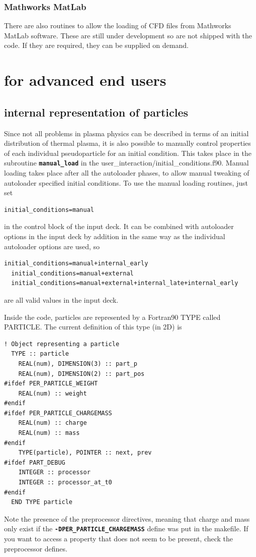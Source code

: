 \documentclass[12pt,a4paper]{article}
\newcommand{\simpleboxverbatim}{\begin{Verbatim}[obeytabs=true,frame=single,
  framerule=0.5mm,rulecolor=\color{warwickmid},formatcom=\color{black}]}
\newcommand{\inlinecode}[1]{{\color{warwickred} \bf\texttt{#1}}}
\newcommand{\EPOCH}{{\color{warwickdark}\fontfamily{phv}\selectfont{EPOCH}}}
\begin{document}
\subsubsection{Mathworks MatLab}
There are also routines to allow the loading of CFD files from Mathworks
MatLab software. These are still under development so are not shipped with the
code. If they are required, they can be supplied on demand.

\section{{\EPOCH} for advanced end users}

\subsection{{\EPOCH} internal representation of particles}
Since not all problems in plasma physics can be described in terms of an
initial distribution of thermal plasma, it is also possible to manually
control properties of each individual pseudoparticle for an initial
condition. This takes place in the subroutine \inlinecode{manual\_load} in the
user\_interaction/initial\_conditions.f90. Manual loading takes place after
all the autoloader phases, to allow manual tweaking of autoloader specified
initial conditions. To use the manual loading routines, just set\\
\simpleboxverbatim
   initial_conditions=manual
\end{Verbatim}
in the control block of the input deck. It can be combined with autoloader
options in the input deck by addition in the same way as the individual
autoloader options are used, so
\simpleboxverbatim
  initial_conditions=manual+internal_early
  initial_conditions=manual+external
  initial_conditions=manual+external+internal_late+internal_early
\end{Verbatim}
are all valid values in the input deck.

Inside the code, particles are represented by a Fortran90 TYPE called
PARTICLE. The current definition of this type (in 2D) is

\simpleboxverbatim
! Object representing a particle
  TYPE :: particle
    REAL(num), DIMENSION(3) :: part_p
    REAL(num), DIMENSION(2) :: part_pos
#ifdef PER_PARTICLE_WEIGHT
    REAL(num) :: weight
#endif
#ifdef PER_PARTICLE_CHARGEMASS
    REAL(num) :: charge
    REAL(num) :: mass
#endif
    TYPE(particle), POINTER :: next, prev
#ifdef PART_DEBUG
    INTEGER :: processor
    INTEGER :: processor_at_t0
#endif
  END TYPE particle
\end{Verbatim}
Note the presence of the preprocessor directives, meaning that charge and mass
only exist if the \inlinecode{-DPER\_PARTICLE\_CHARGEMASS} define was put in
the makefile. If you want to access a property that does not seem to be
present, check the preprocessor defines.
\end{document}
